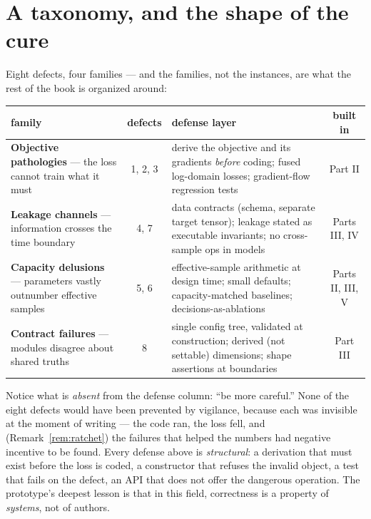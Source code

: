 \section{A taxonomy, and the shape of the cure}\label{sec:taxonomy}

Eight defects, four families --- and the families, not the instances, are
what the rest of the book is organized around:

\begin{center}
\small
\begin{tabular}{@{}p{}cp{}c@{}}
\toprule
family & defects & defense layer & built in \\
\midrule
\textbf{Objective pathologies} --- the loss cannot train what it must
  & 1, 2, 3 & derive the objective and its gradients \emph{before} coding;
  fused log-domain losses; gradient-flow regression tests & Part II \\
\addlinespace
\textbf{Leakage channels} --- information crosses the time boundary
  & 4, 7 & data contracts (schema, separate target tensor); leakage stated
  as executable invariants; no cross-sample ops in models & Parts III, IV \\
\addlinespace
\textbf{Capacity delusions} --- parameters vastly outnumber effective
  samples
  & 5, 6 & effective-sample arithmetic at design time; small defaults;
  capacity-matched baselines; decisions-as-ablations & Parts II, III, V \\
\addlinespace
\textbf{Contract failures} --- modules disagree about shared truths
  & 8 & single config tree, validated at construction; derived (not
  settable) dimensions; shape assertions at boundaries & Part III \\
\bottomrule
\end{tabular}
\end{center}

Notice what is \emph{absent} from the defense column: ``be more careful.''
None of the eight defects would have been prevented by vigilance, because
each was invisible at the moment of writing --- the code ran, the loss fell,
and (Remark~\ref{rem:ratchet}) the failures that helped the numbers had
negative incentive to be found. Every defense above is \emph{structural}:
a derivation that must exist before the loss is coded, a constructor that
refuses the invalid object, a test that fails on the defect, an API that
does not offer the dangerous operation. The prototype's deepest lesson is
that in this field, correctness is a property of \emph{systems}, not of
authors.

